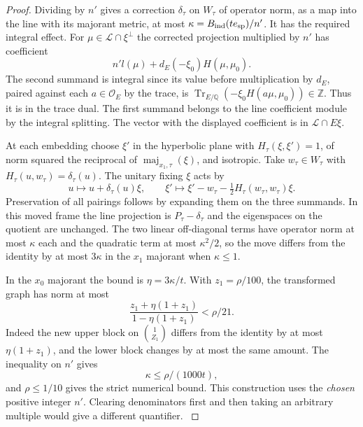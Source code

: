 \begin{proof}
Dividing by \(n'\) gives a correction \(\delta_\tau\) on \(W_\tau\)
of operator norm, as a map into the line with its majorant metric,
at most \(\kappa=B_{\rm ind}(t e_{\rm sp})/n'\).
It has the required integral effect. For \(\mu\in\mathcal L\cap\xi^\perp\)
the corrected projection multiplied by \(n'\) has coefficient
\[
 n'l(\mu)+d_E(-\xi_0)H(\mu,\mu_0).
\]
The second summand is integral since its value before multiplication
by \(d_E\), paired against each \(a\in\mathcal O_E\) by the trace,
is \(\operatorname{Tr}_{E/\mathbb Q}(-\xi_0 H(a\mu,\mu_0))\in\mathbb Z\).
Thus it is in the trace dual. The first summand belongs to the
line coefficient module by the integral splitting. The vector
with the displayed coefficient is in \(\mathcal L\cap E\xi\).

At each embedding choose \(\xi'\) in the hyperbolic plane with
\(H_\tau(\xi,\xi')=1\), of norm squared the reciprocal of
\(\operatorname{maj}_{x_1,\tau}(\xi)\), and isotropic.
Take \(w_\tau\in W_\tau\) with \(H_\tau(u,w_\tau)=\delta_\tau(u)\).
The unitary fixing \(\xi\) acts by
\[
 u\longmapsto u+\delta_\tau(u)\xi,\qquad
 \xi'\longmapsto
 \xi'-w_\tau-\tfrac12 H_\tau(w_\tau,w_\tau)\xi .
\]
Preservation of all pairings follows by expanding them on the
three summands. In this moved frame the line projection is
\(P_\tau-\delta_\tau\) and the eigenspaces on the quotient are
unchanged. The two linear off-diagonal terms have operator
norm at most \(\kappa\) each and the quadratic term at most
\(\kappa^2/2\), so the move differs from the identity by at
most \(3\kappa\) in the \(x_1\) majorant when \(\kappa\le1\).

In the \(x_0\) majorant the bound is \(\eta=3\kappa/t\).
With \(z_1=\rho/100\), the transformed graph has norm at most
\[
 \frac{z_1+\eta(1+z_1)}{1-\eta(1+z_1)}<\rho/21 .
\]
Indeed the new upper block on \(\binom{1}{Z_1}\) differs from
the identity by at most \(\eta(1+z_1)\), and the lower block
changes by at most the same amount. The inequality on \(n'\)
gives 
\[
  \kappa\le\rho/(1000t),
\]
 and \(\rho\le1/10\) gives the
strict numerical bound. This construction uses the \emph{chosen}
positive integer \(n'\). Clearing denominators first and then
taking an arbitrary multiple would give a different quantifier.
\label{cor:slice-split-frame-2}


\end{proof}
